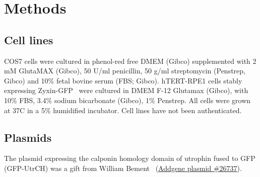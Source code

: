 \section*{Methods}

\subsection*{Cell lines}
COS7 cells were cultured in phenol-red free DMEM (Gibco) supplemented with 2 mM GlutaMAX (Gibco), 50 U/ml penicillin, 50 \textmu{}g/ml streptomycin (Penstrep, Gibco) and 10\% fetal bovine serum (FBS; Gibco). hTERT-RPE1 cells stably expressing Zyxin-GFP~\cite{dix2018role} were cultured in DMEM F-12 Glutamax (Gibco), with 10\% FBS, 3.4\% sodium bicarbonate (Gibco), 1\% Penstrep. All cells were grown at 37\degree C in a 5\%  humidified incubator. Cell lines have not been authenticated.

\subsection*{Plasmids}
The plasmid expressing the calponin homology domain of utrophin fused to GFP (GFP-UtrCH) was a gift from William Bement~\cite{burkel2007versatile} (\href{https://www.addgene.org/26737/}{Addgene plasmid \#26737}). 

